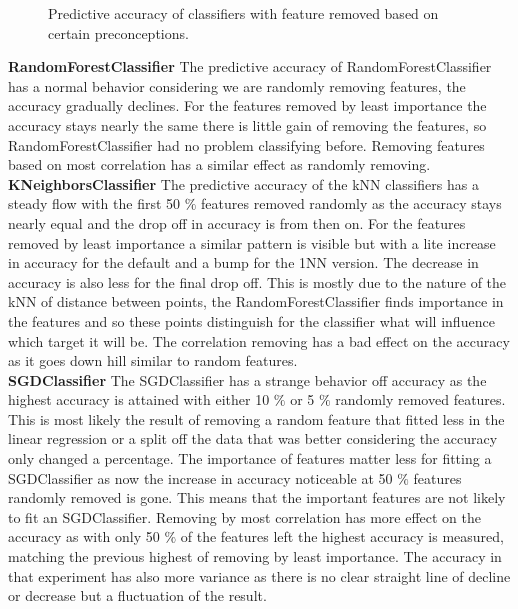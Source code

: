 \documentclass[a4paper,10pt]{article}
\begin{document}
\begin{figure}[H]
	\caption{Predictive accuracy of classifiers with feature removed based on certain preconceptions.}
	\label{fig:Rem}
\end{figure}

\textbf{RandomForestClassifier} The predictive accuracy of RandomForestClassifier has a normal behavior considering we are randomly removing features, the accuracy gradually declines. For the features removed by least importance the accuracy stays nearly the same there is little gain of removing the features, so RandomForestClassifier had no problem classifying before. Removing features based on most correlation has a similar effect as randomly removing. \\

\textbf{KNeighborsClassifier}  The predictive accuracy of the kNN classifiers has a steady flow with the first 50 $\%$ features removed randomly as the accuracy stays nearly equal and the drop off in accuracy is from then on. For the features removed by least importance a similar pattern is visible but with a lite increase in accuracy for the default and a bump for the 1NN version. The decrease in accuracy is also less for the final drop off. This is mostly due to the nature of the kNN of distance between points, the RandomForestClassifier finds importance in the features and so these points distinguish for the classifier what will influence which target it will be. The correlation removing has a bad effect on the accuracy as it goes down hill similar to random features.  \\

\textbf{SGDClassifier} The SGDClassifier has a strange behavior off accuracy as the highest accuracy is attained with either 10 $\%$ or 5 $\%$ randomly removed features. This is most likely the result of removing a random feature that fitted less in the linear regression or a split off the data that was better considering the accuracy only changed a percentage. The importance of features matter less for fitting a SGDClassifier as now the increase in accuracy noticeable at 50 $\%$ features randomly removed is gone. This means that the important features are not likely to fit an SGDClassifier. Removing by most correlation has more effect on the accuracy as with only 50 $\%$ of the features left the highest accuracy is measured, matching the previous highest of removing by least importance. The accuracy in that experiment has also more variance as there is no clear straight line of decline or decrease but a fluctuation of the result.   \\
\end{document}
